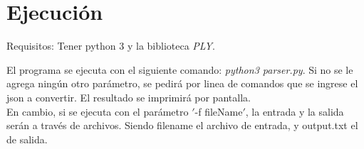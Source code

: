 \section{Ejecución}
Requisitos: Tener python 3 y la biblioteca \textit{PLY}.

El programa se ejecuta con el siguiente comando: \textit{python3 parser.py}. Si no se le agrega ningún otro parámetro, se pedirá por linea de comandos que se ingrese el json a convertir. El resultado se imprimirá por pantalla. \\
En cambio, si se ejecuta con el parámetro  $'$-f fileName$'$, la entrada y la salida serán a través de archivos. Siendo filename el archivo de entrada, y output.txt el de salida.


